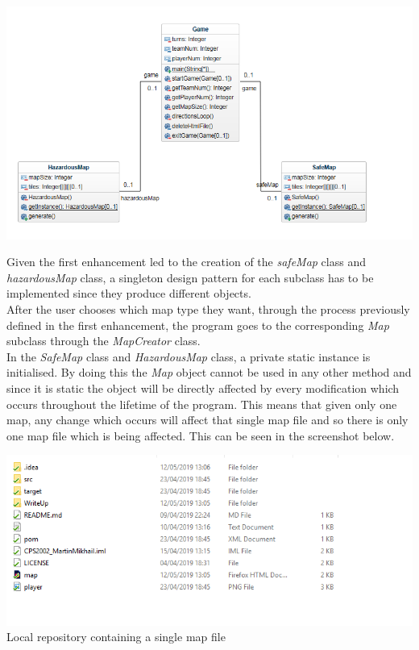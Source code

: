 \documentclass[a4paper,12pt]{extarticle}
\begin{document}
\begin{center}
\includegraphics[width=\textwidth]{Enhancement2CD.png}\\
\end{center}

\noindent Given the first enhancement led to the creation of the \textit{safeMap} class and \textit{hazardousMap} class, a singleton design pattern for each subclass has to be implemented since they produce different objects.\\

\noindent After the user chooses which map type they want, through the process previously defined in the first enhancement, the program goes to the corresponding \textit{Map} subclass through the \textit{MapCreator} class.\\ 

\noindent In the \textit{SafeMap} class and \textit{HazardousMap} class, a private static instance is initialised. By doing this the \textit{Map} object cannot be used in any other method and since it is static the object will be directly affected by every modification which occurs throughout the lifetime of the program. This means that given only one map, any change which occurs will affect that single map file and so there is only one map file which is being affected. This can be seen in the screenshot below.\\

\begin{center}
\includegraphics[width=\textwidth]{Singleton1.png}\\
Local repository containing a single map file
\end{center}
\end{document}
